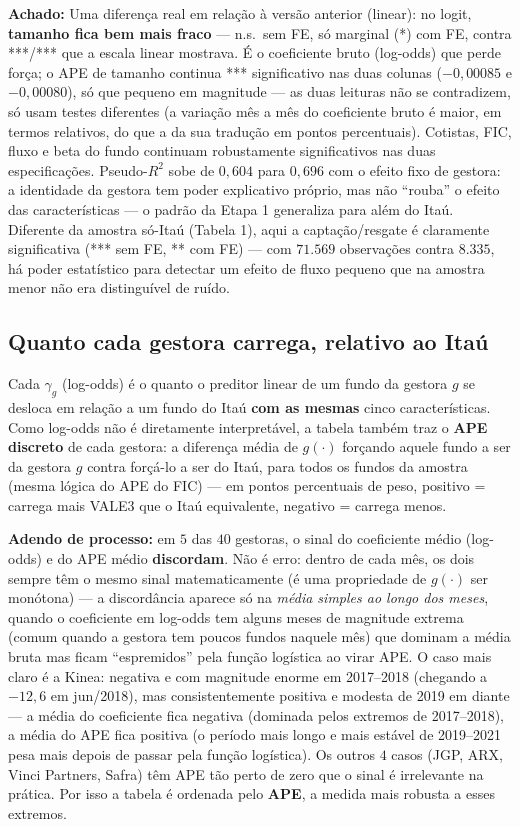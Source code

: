 \documentclass[11pt,a4paper]{article}
\newcommand{\aha}[1]{\par\vspace{4pt}\noindent\textbf{\color{vermelho}Achado:} #1\par\vspace{2pt}}
\begin{document}
\aha{Uma diferença real em relação à versão anterior (linear): no logit, \textbf{tamanho fica bem
mais fraco} --- n.s.\ sem FE, só marginal (*) com FE, contra ***/*** que a escala linear
mostrava. É o coeficiente bruto (log-odds) que perde força; o APE de tamanho continua ***
significativo nas duas colunas ($-0{,}00085$ e $-0{,}00080$), só que pequeno em magnitude --- as
duas leituras não se contradizem, só usam testes diferentes (a variação mês a mês do coeficiente
bruto é maior, em termos relativos, do que a da sua tradução em pontos percentuais). Cotistas,
FIC, fluxo e beta do fundo continuam robustamente significativos nas duas especificações. Pseudo-$R^2$
sobe de $0{,}604$ para $0{,}696$ com o efeito fixo de gestora: a identidade da gestora tem poder
explicativo próprio, mas não ``rouba'' o efeito das características --- o padrão da Etapa 1
generaliza para além do Itaú. Diferente da amostra só-Itaú (Tabela 1), aqui a captação/resgate é
claramente significativa (*** sem FE, ** com FE) --- com $71.569$ observações contra $8.335$, há
poder estatístico para detectar um efeito de fluxo pequeno que na amostra menor não era
distinguível de ruído.}

\subsection{Quanto cada gestora carrega, relativo ao Itaú}

Cada $\gamma_g$ (log-odds) é o quanto o preditor linear de um fundo da gestora $g$ se desloca em
relação a um fundo do Itaú \textbf{com as mesmas} cinco características. Como log-odds não é
diretamente interpretável, a tabela também traz o \textbf{APE discreto} de cada gestora: a
diferença média de $g(\cdot)$ forçando aquele fundo a ser da gestora $g$ contra forçá-lo a ser do
Itaú, para todos os fundos da amostra (mesma lógica do APE do FIC) --- em pontos percentuais de
peso, positivo = carrega mais VALE3 que o Itaú equivalente, negativo = carrega menos.

\textbf{Adendo de processo:} em $5$ das $40$ gestoras, o sinal do coeficiente médio (log-odds) e
do APE médio \textbf{discordam}. Não é erro: dentro de cada mês, os dois sempre têm o mesmo sinal
matematicamente (é uma propriedade de $g(\cdot)$ ser monótona) --- a discordância aparece só na
\emph{média simples ao longo dos meses}, quando o coeficiente em log-odds tem alguns meses de
magnitude extrema (comum quando a gestora tem poucos fundos naquele mês) que dominam a média bruta
mas ficam ``espremidos'' pela função logística ao virar APE. O caso mais claro é a Kinea: negativa
e com magnitude enorme em 2017--2018 (chegando a $-12{,}6$ em jun/2018), mas consistentemente
positiva e modesta de 2019 em diante --- a média do coeficiente fica negativa (dominada pelos
extremos de 2017--2018), a média do APE fica positiva (o período mais longo e mais estável de
2019--2021 pesa mais depois de passar pela função logística). Os outros $4$ casos (JGP, ARX,
Vinci Partners, Safra) têm APE tão perto de zero que o sinal é irrelevante na prática. Por isso a
tabela é ordenada pelo \textbf{APE}, a medida mais robusta a esses extremos.
\end{document}
